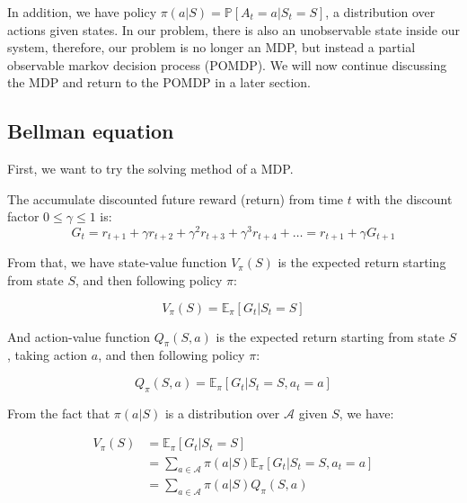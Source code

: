 \documentclass[
  a4paper, xcolor = usenames,dvipsnames]{article}
\theoremstyle{definition}
\theoremstyle{definition}
\theoremstyle{definition}
\theoremstyle{definition}
\theoremstyle{remark}
\begin{document}
In addition, we have policy \(\pi(a | S) = \mathbb{P}[A_{t} = a | S_{t} = S]\), a distribution over actions given states. In our problem, there is also an unobservable state inside our system, therefore, our problem is no longer an MDP, but instead a partial observable markov decision process (POMDP). We will now continue discussing the MDP and return to the POMDP in a later section.

\hypertarget{bellman-equation}{%
\subsection{Bellman equation}\label{bellman-equation}}

First, we want to try the solving method of a MDP.

The accumulate discounted future reward (return) from time \(t\) with the discount factor \(0 \le \gamma \le 1\) is:
\[
G_{t} = r_{t + 1} + \gamma r_{t + 2} + \gamma^{2} r_{t + 3} + \gamma^{3} r_{t + 4} + \dots = r_{t + 1} + \gamma G_{t + 1}
\]

From that, we have state-value function \(V_{\pi}(S)\) is the expected return starting from state \(S\), and then following policy \(\pi\):

\begin{equation}
V_{\pi}(S) = \mathbb{E}_{\pi}[G_{t} | S_{t} = S]
\label{eq:state-value}
\end{equation}

And action-value function \(Q_{\pi}(S, a)\) is the expected return starting from state \(S\), taking action \(a\), and then following policy \(\pi\):

\begin{equation}
Q_{\pi}(S, a) = \mathbb{E}_{\pi}[G_{t} | S_{t} = S, a_{t} = a]
\label{eq:action-value}
\end{equation}

From the fact that \(\pi(a | S)\) is a distribution over \(\mathcal{A}\) given \(S\), we have:

\begin{equation}
\begin{split}
V_{\pi}(S) {}&= \mathbb{E}_{\pi}[G_{t} | S_{t} = S] \\
  &= \sum_{a \in \mathcal{A}} \pi(a | S) \mathbb{E}_{\pi}[G_{t} | S_{t} = S, a_{t} = a] \\
  &= \sum_{a \in \mathcal{A}} \pi(a | S) Q_{\pi}(S, a)
\label{eq:v-to-q}
\end{split}
\end{equation}
\end{document}
